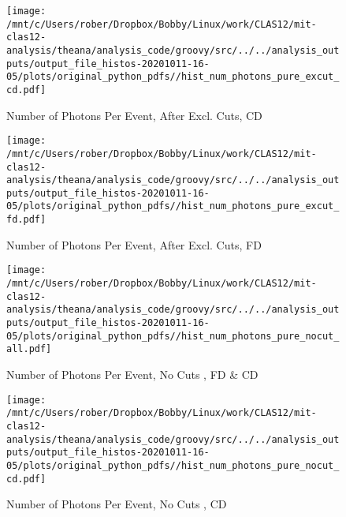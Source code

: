 \documentclass{article}
\begin{document}
\begin{landscape}
    \begin{figure}[h]
        \centering

        \texttt{[image: /mnt/c/Users/rober/Dropbox/Bobby/Linux/work/CLAS12/mit-clas12-analysis/theana/analysis\_code/groovy/src/../../analysis\_outputs/output\_file\_histos-20201011-16-05/plots/original\_python\_pdfs//hist\_num\_photons\_pure\_excut\_cd.pdf]}
        \captionsetup{textformat=empty,labelformat=blank}
        \caption{Number of Photons Per Event, After Excl. Cuts, CD}
    \end{figure}
    \clearpage
    
    \begin{figure}[h]
        \centering

        \texttt{[image: /mnt/c/Users/rober/Dropbox/Bobby/Linux/work/CLAS12/mit-clas12-analysis/theana/analysis\_code/groovy/src/../../analysis\_outputs/output\_file\_histos-20201011-16-05/plots/original\_python\_pdfs//hist\_num\_photons\_pure\_excut\_fd.pdf]}
        \captionsetup{textformat=empty,labelformat=blank}
        \caption{Number of Photons Per Event, After Excl. Cuts, FD}
    \end{figure}
    \clearpage
    
    \begin{figure}[h]
        \centering

        \texttt{[image: /mnt/c/Users/rober/Dropbox/Bobby/Linux/work/CLAS12/mit-clas12-analysis/theana/analysis\_code/groovy/src/../../analysis\_outputs/output\_file\_histos-20201011-16-05/plots/original\_python\_pdfs//hist\_num\_photons\_pure\_nocut\_all.pdf]}
        \captionsetup{textformat=empty,labelformat=blank}
        \caption{Number of Photons Per Event, No Cuts , FD \& CD}
    \end{figure}
    \clearpage
    
    \begin{figure}[h]
        \centering

        \texttt{[image: /mnt/c/Users/rober/Dropbox/Bobby/Linux/work/CLAS12/mit-clas12-analysis/theana/analysis\_code/groovy/src/../../analysis\_outputs/output\_file\_histos-20201011-16-05/plots/original\_python\_pdfs//hist\_num\_photons\_pure\_nocut\_cd.pdf]}
        \captionsetup{textformat=empty,labelformat=blank}
        \caption{Number of Photons Per Event, No Cuts , CD}
    \end{figure}
    \clearpage
    
    \begin{figure}[h]
        \centering


\end{figure}
\end{landscape}
\end{document}
